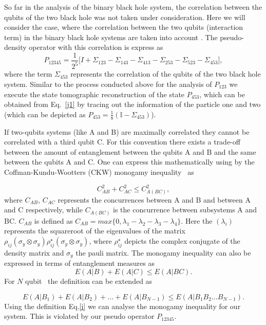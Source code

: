 \documentclass[fleqn,usenatbib]{mnras}
\begin{document}
So far in the analysis of the binary black hole system, the correlation between the qubits of the two black hole was not taken under consideration. Here we will consider the case, where the correlation between the two qubits (interaction term) in the binary black hole systems are taken into account . The pseudo-density operator with this correlation is express as
\begin{equation}\label{j1}
     P_{12345} = \frac{1}{2^5} \Big[I + \Sigma_{123}- \Sigma_{143}-\Sigma_{413}-\Sigma_{253}-\Sigma_{523} -\Sigma_{453} \Big],
\end{equation}
where the term $\Sigma_{453}$ represents the correlation of the qubits of the two black hole system. Similar to the process conducted above for the analysis of $P_{123}$ we execute the state tomographic reconstruction of the state $P_{453}$, which can be obtained from Eq.~\eqref{j1} by tracing out the information of the particle one and two (which can be depicted as $P_{453}=\frac{1}{8} (\mathbb{I} - \Sigma_{453})$).

If two-qubits systems (like A and B) are maximally correlated they cannot be correlated with a third qubit C. For this convention  there exists a trade-off between the amount of entanglement between the qubits A and B and the same between the qubits A and C. One can express this mathematically using by the Coffman-Kundu-Wootters (CKW) monogamy inequality~\citep{coffman12,oso} as

\begin{equation}\label{g}
   C_{AB}^2+ C_{AC}^2 \leq C_{A(BC)}^2,
\end{equation}
where $C_{AB}$, $C_{AC}$ represents the concurrences between A and B and between A and C respectively, while $C_{A(BC)}$ is the concurrence between subsystems A and BC. $C_{AB}$ is defined as $C_{AB} = max \{0,\lambda_1 - \lambda_2 - \lambda_3 - \lambda_4\}$. Here the $(\lambda_i)$ represents the squareroot of the eigenvalues of the matrix $\rho_{ij} (\sigma_y \otimes \sigma_y) \rho_{ij}^{\star} (\sigma_y \otimes \sigma_y)$, where $\rho_{ij}^{\star}$ depicts the complex conjugate of the density matrix and $\sigma_y$ the pauli matrix.  The monogamy inequality can also be expressed in terms of entanglement measures as 
\begin{equation}\label{h}
    E(A|B)+ E(A|C) \leq E(A|BC).
\end{equation}
For $N$ qubit~\citep{Zhu1} the definition can be extended as

\begin{equation}\label{i}
    E(A|B_1)+ E(A|B_2) + \dots + E(A|B_{N-1}) \leq E(A|B_1B_2\dots B_{N-1}).
\end{equation}
Using the definition Eq.\ref{i} we can analyse the monogamy inequality for our system. This is violated by our pseudo operator $P_{12345}$. 
\end{document}
